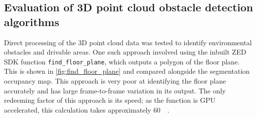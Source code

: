 \subsection{Evaluation of 3D point cloud obstacle detection algorithms}
Direct processing of the 3D point cloud data was tested to identify environmental obstacles and drivable areas.
One such approach involved using the inbuilt ZED SDK function \texttt{find\_floor\_plane},
which outputs a polygon of the floor plane.
This is shown in \cref{fig:find_floor_plane} and compared alongside the segmentation occupancy map.
This approach is very poor at identifying the floor plane accurately and has large frame-to-frame
variation in its output. The only redeeming factor of this approach is its speed;
as the function is GPU accelerated, this calculation takes approximately \SI{60}{\milli\seconds}.

